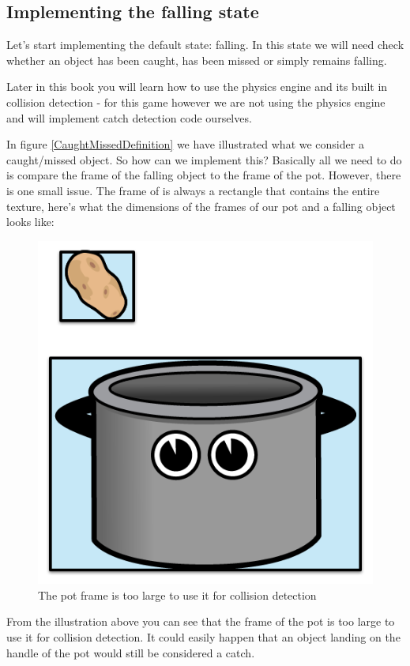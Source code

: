 \subsection{Implementing the falling state}
Let's start implementing the default state: falling. In this state we will need
check whether an object has been caught, has been missed or simply remains
falling. 

Later in this book you will learn how to use the \cocos{} physics
engine and its built in collision detection - for this game however we are not
using the physics engine and will implement catch detection code ourselves.

In figure \ref{CaughtMissedDefinition} we have illustrated what we consider a
caught/missed object. So how can we implement this? Basically all we need to do
is compare the frame of the falling object to the frame of the pot. However,
there is one small issue. The frame of \ccsprite{} is always a rectangle that
contains the entire texture, here's what the dimensions of the frames of our pot
and a falling object looks like:
\begin{figure}[H]
		\centering
		\includegraphics[width=0.3\linewidth]{images/Chapter3/frame_pot_falling_object.png}
		\caption{The pot frame is too large to use it for collision detection}
\end{figure}
From the illustration above you can see that the frame of the pot is too large
to use it for collision detection. It could easily happen that an object
landing on the handle of the pot would still be considered a catch.

